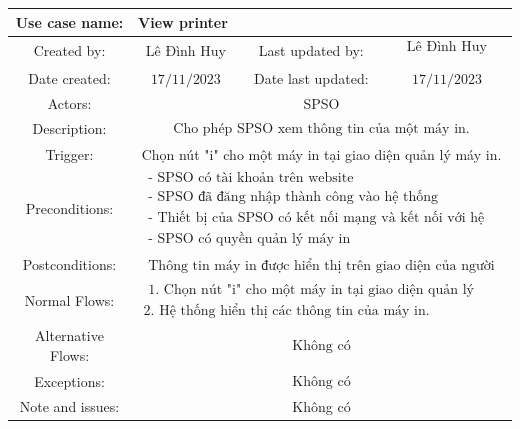 \begin{tabular}{|c|c|c|c|}
\hline Use case name: & \multicolumn{3}{|l|}{ View printer} \\
\hline Created by: & Lê Đình Huy & Last updated by: & $\begin{array}{l}\text { Lê Đình Huy } \\\end{array}$ \\
\hline Date created: & $17 / 11 / 2023$ & Date last updated: & $17 / 11 / 2023$\\
\hline Actors: & \multicolumn{3}{|c|}{ SPSO } \\
\hline Description: & \multicolumn{3}{|c|}{$\begin{array}{l}\text { Cho phép SPSO xem thông tin của một máy in. }\end{array}$} \\
\hline Trigger: & \multicolumn{3}{|c|}{ Chọn nút "i" cho một máy in tại giao diện quản lý máy in. } \\
\hline Preconditions: & \multicolumn{3}{|c|}{$\begin{array}{l}\text { - SPSO có tài khoản trên website } \\
\text { - SPSO đã đăng nhập thành công vào hệ thống } \\
\text { - Thiết bị của SPSO có kết nối mạng và kết nối với hệ thống }\\
\text { - SPSO có quyền quản lý máy in }\end{array}$} \\
\hline Postconditions: & \multicolumn{3}{|c|}{$\begin{array}{l}\text { Thông tin máy in được hiển thị trên giao diện của người dùng.} \end{array}$} \\
\hline Normal Flows: & \multicolumn{3}{|c|}{$\begin{array}{l}\text { 1. Chọn nút "i" cho một máy in tại giao diện quản lý máy in. }  \\
\text {2. Hệ thống hiển thị các thông tin của máy in. } \end{array}$} \\
\hline  Alternative Flows: & \multicolumn{3}{|c|}{$\begin{array}{l} 
\text {Không có}\end{array}$} \\
\hline Exceptions: & \multicolumn{3}{|c|}{$\begin{array}{l}
\text {Không có}\end{array}$} \\
\hline Note and issues: & \multicolumn{3}{|c|}{ Không có } \\
\hline
\end{tabular}

